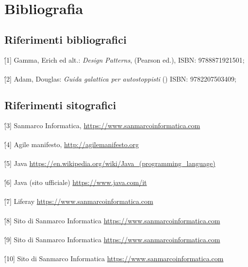 \newpage
\chapter{Bibliografia}
\label{cap:bibliografia}



\section*{Riferimenti bibliografici}
\'[1]  Gamma, Erich ed alt.: \emph{Design Patterns}, (Pearson ed.), ISBN: 9788871921501;\\
\\
\'[2]  Adam, Douglas: \emph{Guida galattica per autostoppisti} () ISBN: 9782207503409;
\section*{Riferimenti sitografici}
\'[3] Sanmarco Informatica, \href{https://www.sanmarcoinformatica.com/}{https://www.sanmarcoinformatica.com}\\
\\
\'[4] Agile manifesto, \href{http://agilemanifesto.org}{http://agilemanifesto.org}\\
\\
\'[5] Java \href{https://en.wikipedia.org/wiki/Java_(programming_language)}{https://en.wikipedia.org/wiki/Java\_(programming\_language)}\\
\\
\'[6] Java (sito ufficiale) \href{https://www.java.com/it}{https://www.java.com/it}\\
\\
\'[7] Liferay \href{https://www.sanmarcoinformatica.com/}{https://www.sanmarcoinformatica.com}\\
\\
\'[8] Sito di Sanmarco Informatica \href{https://www.sanmarcoinformatica.com/}{https://www.sanmarcoinformatica.com}\\
\\
\'[9] Sito di Sanmarco Informatica \href{https://www.sanmarcoinformatica.com/}{https://www.sanmarcoinformatica.com}\\
\\
\'[10] Sito di Sanmarco Informatica \href{https://www.sanmarcoinformatica.com/}{https://www.sanmarcoinformatica.com}\\
\\
\newpage

